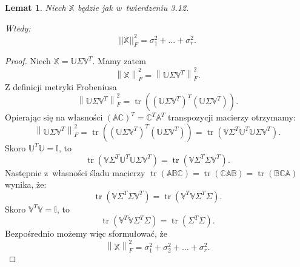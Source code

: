 \documentclass[12pt,a4paper]{report}
\newtheorem{lemat}[df]{Lemat}
\newcommand{\norma}[1]{\left\| {#1} \right\|}
\newcommand{\tr}[1]{\operatorname{tr}\left({#1} \right)}
\begin{document}
\begin{lemat}
Niech $\mathbb{X}$ będzie jak w~twierdzeniu 3.12.

Wtedy:
$$
||\mathbb{X}||_F^2 = \sigma_{1}^2+...+\sigma_{r}^2.
$$
\end{lemat}

\begin{proof}
Niech $\mathbb{X}=\mathbb{U} \Sigma \mathbb{V}^T$.
Mamy zatem 
$$
\norma{ \mathbb{X}}_F^2 =
\norma{\mathbb{U} \Sigma \mathbb{V}^T}_F^2.
$$
Z definicji metryki Frobeniusa
$$
\norma{\mathbb{U} \Sigma \mathbb{V}^T}_F^2 = \tr{(\mathbb{U} \Sigma \mathbb{V}^T)^T (\mathbb{U} \Sigma \mathbb{V}^T)}.
$$
Opierając się na własności $(\mathbb{A}\mathbb{C})^T = \mathbb{C}^T \mathbb{A}^T$ transpozycji macierzy otrzymamy:
$$
\norma{\mathbb{U} \Sigma \mathbb{V}^T}_F^2 = \tr{(\mathbb{U} \Sigma \mathbb{V}^T)^T (\mathbb{U} \Sigma \mathbb{V}^T)} = \tr{\mathbb{V} \Sigma^T \mathbb{U}^T \mathbb{U} \Sigma \mathbb{V}^T}.
$$
Skoro $\mathbb{U}^T \mathbb{U} = \mathbb{I}$, to
$$
\tr{\mathbb{V} \Sigma^T \mathbb{U}^T \mathbb{U} \Sigma \mathbb{V}^T} = \tr{\mathbb{V} \Sigma ^T \Sigma \mathbb{V}^T}.
$$
Następnie z~własności śladu macierzy $\tr{\mathbb{A} \mathbb{B} \mathbb{C}}  = \tr{\mathbb{C} \mathbb{A} \mathbb{B}} = \tr{\mathbb{B} \mathbb{C} \mathbb{A}}$ wynika, że:
$$
\tr{\mathbb{V} \Sigma ^T \Sigma \mathbb{V}^T} = \tr{\mathbb{V}^T \mathbb{V} \Sigma^T \Sigma}.
$$
Skoro $\mathbb{V}^T \mathbb{V} = \mathbb{I}$, to
$$
\tr{\mathbb{V}^T \mathbb{V} \Sigma^T \Sigma} = \tr{\Sigma^T \Sigma}.
$$
Bezpośrednio możemy więc sformułować, że
$$
\norma{ \mathbb{X}}_F^2 = \sigma_{1}^2 + \sigma_{2}^2 + \ldots + \sigma_{r}^2.
$$
\end{proof}
\end{document}
